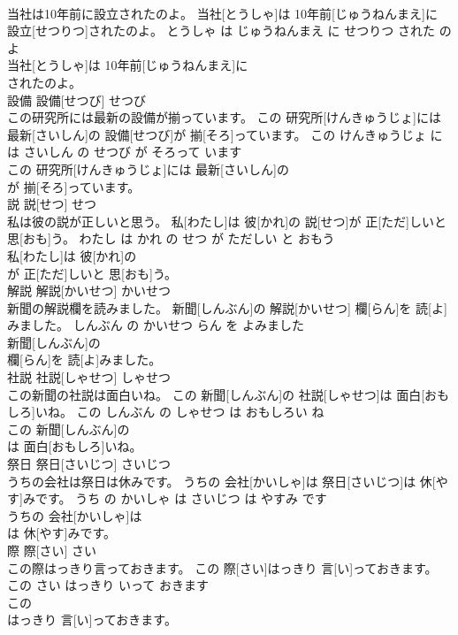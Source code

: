 \documentclass[8pt]{extreport}
\begin{document}
\begin{CJK}{UTF8}{min}
\\	当社は10年前に設立されたのよ。	当社[とうしゃ]は 10年前[じゅうねんまえ]に 設立[せつりつ]されたのよ。	とうしゃ は じゅうねんまえ に せつりつ された の よ	
\\	当社[とうしゃ]は 10年前[じゅうねんまえ]に
\\	されたのよ。			
\\	設備	設備[せつび]	せつび	
\\	この研究所には最新の設備が揃っています。	この 研究所[けんきゅうじょ]には 最新[さいしん]の 設備[せつび]が 揃[そろ]っています。	この けんきゅうじょ に は さいしん の せつび が そろって います	
\\	この 研究所[けんきゅうじょ]には 最新[さいしん]の
\\	が 揃[そろ]っています。			
\\	説	説[せつ]	せつ	
\\	私は彼の説が正しいと思う。	私[わたし]は 彼[かれ]の 説[せつ]が 正[ただ]しいと 思[おも]う。	わたし は かれ の せつ が ただしい と おもう	
\\	私[わたし]は 彼[かれ]の
\\	が 正[ただ]しいと 思[おも]う。			
\\	解説	解説[かいせつ]	かいせつ	
\\	新聞の解説欄を読みました。	新聞[しんぶん]の 解説[かいせつ] 欄[らん]を 読[よ]みました。	しんぶん の かいせつ らん を よみました	
\\	新聞[しんぶん]の
\\	欄[らん]を 読[よ]みました。			
\\	社説	社説[しゃせつ]	しゃせつ	
\\	この新聞の社説は面白いね。	この 新聞[しんぶん]の 社説[しゃせつ]は 面白[おもしろ]いね。	この しんぶん の しゃせつ は おもしろい ね	
\\	この 新聞[しんぶん]の
\\	は 面白[おもしろ]いね。			
\\	祭日	祭日[さいじつ]	さいじつ	
\\	うちの会社は祭日は休みです。	うちの 会社[かいしゃ]は 祭日[さいじつ]は 休[やす]みです。	うち の かいしゃ は さいじつ は やすみ です	
\\	うちの 会社[かいしゃ]は
\\	は 休[やす]みです。			
\\	際	際[さい]	さい	
\\	この際はっきり言っておきます。	この 際[さい]はっきり 言[い]っておきます。	この さい はっきり いって おきます	
\\	この
\\	はっきり 言[い]っておきます。			

\end{CJK}
\end{document}
